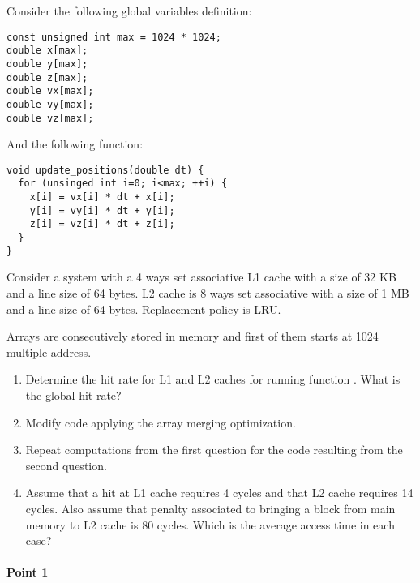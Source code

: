 \begin{acexercise}\end{acexercise}

Consider the following global variables definition:

\begin{lstlisting}
const unsigned int max = 1024 * 1024;
double x[max];
double y[max];
double z[max];
double vx[max];
double vy[max];
double vz[max];
\end{lstlisting}

And the following function:

\begin{lstlisting}
void update_positions(double dt) {
  for (unsinged int i=0; i<max; ++i) {
    x[i] = vx[i] * dt + x[i];
    y[i] = vy[i] * dt + y[i];
    z[i] = vz[i] * dt + z[i];
  }
}
\end{lstlisting}

Consider a system with a 4 ways set associative L1 cache with a size of 32 KB and a line
size of 64 bytes. L2 cache is 8 ways set associative with a size of 1 MB and a line size
of 64 bytes. Replacement policy is LRU.

Arrays are consecutively stored in memory and first of them starts at 1024 multiple address.

\begin{enumerate}
  \item Determine the hit rate for L1 and L2 caches for running function
        . What is the global hit rate?

  \item Modify code applying the array merging optimization.

  \item Repeat computations from the first question for the code resulting from
        the second question.

  \item Assume that a hit at L1 cache requires 4 cycles and that L2 cache requires
        14 cycles. Also assume that penalty associated to bringing a block from
        main memory to L2 cache is 80 cycles. Which is the average access time in 
        each case?

\end{enumerate}


\begin{acsolution}\end{acsolution}

\paragraph{Point 1}

